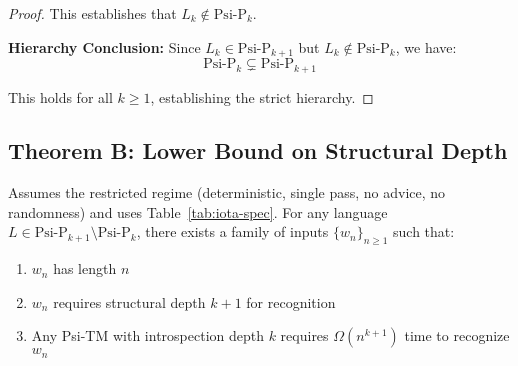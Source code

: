 \begin{proof}
This establishes that $L_k \notin \text{Psi-P}_k$.

\textbf{Hierarchy Conclusion:}
Since $L_k \in \text{Psi-P}_{k+1}$ but $L_k \notin \text{Psi-P}_k$, we have:
$$\text{Psi-P}_k \subsetneq \text{Psi-P}_{k+1}$$

This holds for all $k \geq 1$, establishing the strict hierarchy.
\end{proof}

\subsection{Theorem B: Lower Bound on Structural Depth}

\begin{theorem}
\label{thm:structural-depth-lower-bound-1}
Assumes the restricted regime (deterministic, single pass, no advice, no randomness) and uses Table~\ref{tab:iota-spec}.
For any language $L \in \text{Psi-P}_{k+1} \setminus \text{Psi-P}_k$, there exists a family of inputs $\{w_n\}_{n \geq 1}$ such that:
\begin{enumerate}
\item $w_n$ has length $n$
\item $w_n$ requires structural depth $k+1$ for recognition
\item Any Psi-TM with introspection depth $k$ requires $\Omega(n^{k+1})$ time to recognize $w_n$
\end{enumerate}
\end{theorem}

